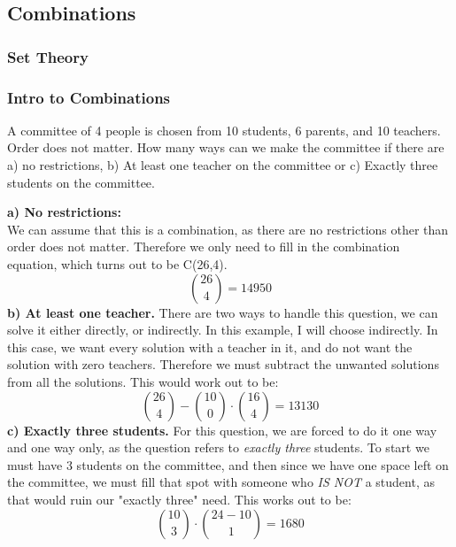     \subsection{Combinations}
    
        \subsubsection{Set Theory}
    
        \subsubsection{Intro to Combinations}            
            \begin{example}
                A committee of 4 people is chosen from 10 students, 6 parents, and 10 teachers. Order does not matter. How many ways can we make the committee if there are a) no restrictions, b) At least one teacher on the committee or c) Exactly three students on the committee.
            \end{example}
            \textbf{a) No restrictions:}\\
            We can assume that this is a combination, as there are no restrictions other than order does not matter. Therefore we only need to fill in the combination equation, which turns out to be C(26,4). 
            \begin{equation*}
                \binom{26}{4} = 14950
            \end{equation*}
            \textbf{b) At least one teacher.}
            There are two ways to handle this question, we can solve it either directly, or indirectly. In this example, I will choose indirectly. In this case, we want every solution with a teacher in it, and do not want the solution with zero teachers. Therefore we must subtract the unwanted solutions from all the solutions. This would work out to be:
            \begin{equation*}
                \binom{26}{4} - \binom{10}{0}\cdot\binom{16}{4} = 13130
            \end{equation*}
            \textbf{c) Exactly three students.}
            For this question, we are forced to do it one way and one way only, as the question refers to \emph{exactly three} students. To start we must have 3 students on the committee, and then since we have one space left on the committee, we must fill that spot with someone who \emph{IS NOT} a student, as that would ruin our "exactly three" need. This works out to be:
            \begin{equation*}
                \binom{10}{3}\cdot\binom{24-10}{1} = 1680
            \end{equation*}
        
